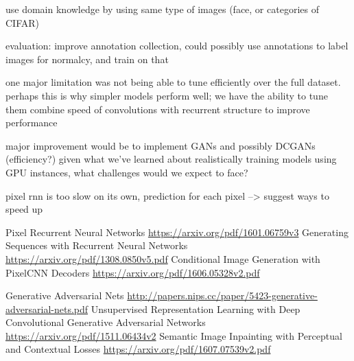 \documentclass[10pt,twocolumn,letterpaper]{article}
\begin{document}
use domain knowledge by using same type of images (face, or categories of CIFAR)

evaluation: 
improve annotation collection, could possibly use annotations to label images for normalcy, and train on that

one major limitation was not being able to tune efficiently over the full dataset. 
perhaps this is why simpler models perform well; we have the ability to tune them
combine speed of convolutions with recurrent structure to improve performance

major improvement would be to implement GANs and possibly DCGANs (efficiency?) given what we've learned about realistically training models using GPU instances, what challenges would we expect to face?



pixel rnn is too slow on its own, prediction for each pixel --> suggest ways to speed up


\begin{thebibliography}{1}
 Pixel Recurrent Neural Networks \url{https://arxiv.org/pdf/1601.06759v3}
 Generating Sequences with Recurrent Neural Networks \url{https://arxiv.org/pdf/1308.0850v5.pdf}
 Conditional Image Generation with PixelCNN Decoders \url{https://arxiv.org/pdf/1606.05328v2.pdf}

 Generative Adversarial Nets \url{http://papers.nips.cc/paper/5423-generative-adversarial-nets.pdf}
 Unsupervised Representation Learning with Deep Convolutional Generative Adversarial Networks \url{https://arxiv.org/pdf/1511.06434v2}
 Semantic Image Inpainting with Perceptual and Contextual Losses \url{https://arxiv.org/pdf/1607.07539v2.pdf}
\end{thebibliography}
\end{document}
